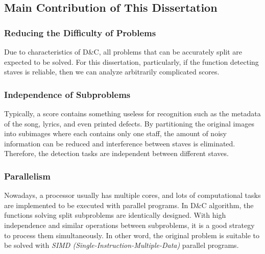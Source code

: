 \subsection{Main Contribution of This Dissertation}
\label{subsec:advantages}

\subsubsection{Reducing the Difficulty of Problems}

Due to characteristics of D\&C, all problems that can be accurately split are expected to be solved. For this dissertation, particularly, if the function detecting staves is reliable, then we can analyze arbitrarily complicated scores.

\subsubsection{Independence of Subproblems}

Typically, a score contains something useless for recognition such as the metadata of the song, lyrics, and even printed defects. By partitioning the original images into subimages where each contains only one staff, the amount of noisy information can be reduced and interference between staves is eliminated. Therefore, the detection tasks are independent between different staves.

\subsubsection{Parallelism}

Nowadays, a processor usually has multiple cores, and lots of computational tasks are implemented to be executed with parallel programs. In D\&C algorithm, the functions solving split subproblems are identically designed. With high independence and similar operations between subproblems, it is a good strategy to process them simultaneously. In other word, the original problem is suitable to be solved with \emph{SIMD (Single-Instruction-Multiple-Data)} parallel programs.
